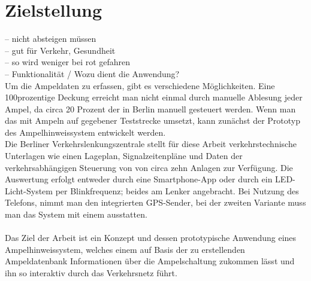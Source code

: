 \section{Zielstellung}
-- nicht absteigen müssen \\
-- gut für Verkehr, Gesundheit \\
-- so wird weniger bei rot gefahren \\
-- Funktionalität / Wozu dient die Anwendung? \\
Um die Ampeldaten zu erfassen, gibt es verschiedene Möglichkeiten. Eine 100prozentige Deckung erreicht man nicht einmal durch manuelle Ablesung jeder Ampel, da circa 20 Prozent der  in Berlin manuell gesteuert werden. Wenn man das mit Ampeln auf gegebener Teststrecke umsetzt, kann zunächst der Prototyp des Ampelhinweissystem entwickelt werden. \\
Die Berliner Verkehrslenkungszentrale stellt für diese Arbeit verkehrstechnische Unterlagen wie einen Lageplan, Signalzeitenpläne und Daten der verkehrsabhängigen Steuerung von  von circa zehn Anlagen zur Verfügung.
Die Auswertung erfolgt entweder durch eine Smartphone-App oder durch ein \gls{LED}-Licht-System per Blinkfrequenz; beides am Lenker angebracht. Bei Nutzung des Telefons, nimmt man den integrierten \gls{GPS}-Sender, bei der zweiten Variante muss man das System mit einem ausstatten.
\\\\
Das Ziel der Arbeit ist ein Konzept und dessen prototypische Anwendung eines Ampelhinweissystem, welches einem auf Basis der zu erstellenden  Ampeldatenbank Informationen über die Ampelschaltung zukommen lässt und ihn so interaktiv durch das Verkehrsnetz führt.
